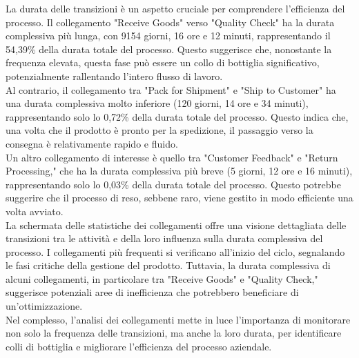 \documentclass{article}
\begin{document}
La durata delle transizioni è un aspetto cruciale per comprendere l'efficienza del processo. Il collegamento "Receive Goods" verso "Quality Check" ha la durata complessiva più lunga, con 9154 giorni, 16 ore e 12 minuti, rappresentando il 54,39\% della durata totale del processo. Questo suggerisce che, nonostante la frequenza elevata, questa fase può essere un collo di bottiglia significativo, potenzialmente rallentando l'intero flusso di lavoro.\\
Al contrario, il collegamento tra "Pack for Shipment" e "Ship to Customer" ha una durata complessiva molto inferiore (120 giorni, 14 ore e 34 minuti), rappresentando solo lo 0,72\% della durata totale del processo. Questo indica che, una volta che il prodotto è pronto per la spedizione, il passaggio verso la consegna è relativamente rapido e fluido.\\
Un altro collegamento di interesse è quello tra "Customer Feedback" e "Return Processing," che ha la durata complessiva più breve (5 giorni, 12 ore e 16 minuti), rappresentando solo lo 0,03\% della durata totale del processo. Questo potrebbe suggerire che il processo di reso, sebbene raro, viene gestito in modo efficiente una volta avviato.\\
La schermata delle statistiche dei collegamenti offre una visione dettagliata delle transizioni tra le attività e della loro influenza sulla durata complessiva del processo. I collegamenti più frequenti si verificano all'inizio del ciclo, segnalando le fasi critiche della gestione del prodotto. Tuttavia, la durata complessiva di alcuni collegamenti, in particolare tra "Receive Goods" e "Quality Check," suggerisce potenziali aree di inefficienza che potrebbero beneficiare di un'ottimizzazione.\\
Nel complesso, l'analisi dei collegamenti mette in luce l'importanza di monitorare non solo la frequenza delle transizioni, ma anche la loro durata, per identificare colli di bottiglia e migliorare l'efficienza del processo aziendale.
\end{document}

